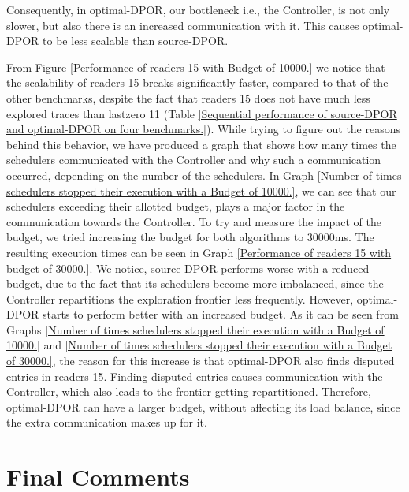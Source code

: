 Consequently, in optimal-DPOR, our bottleneck i.e., the Controller, is not only slower, but also there is an increased communication with it. This causes optimal-DPOR to be less scalable than source-DPOR.

From Figure \ref{Performance of readers 15 with Budget of 10000.} we notice that the scalability 
of readers 15 breaks significantly faster,
compared to that of the other benchmarks, despite the fact that readers 15 does not have much less explored traces than lastzero 11
(Table \ref{Sequential performance of source-DPOR and optimal-DPOR on four benchmarks.}). 
While trying to figure out the reasons behind this behavior, we have produced a graph that shows how many times the schedulers communicated with the Controller and why such a communication occurred, depending on the number of the schedulers. In Graph \ref{Number of times schedulers stopped their execution with a Budget of 10000.},
we can see that our schedulers exceeding their allotted budget, plays a major factor in the communication towards the Controller.
To try and measure the impact of the budget, we tried increasing the budget for both algorithms to 30000ms. The resulting execution times can be seen in Graph \ref{Performance of readers 15 with budget of 30000.}. We notice, source-DPOR performs worse with a reduced budget, due to the fact that its schedulers become more imbalanced, since the Controller repartitions the exploration frontier less frequently.
However, optimal-DPOR starts to perform better with an increased budget. As it can be seen from Graphs 
\ref{Number of times schedulers stopped their execution with a Budget of 10000.} and \ref{Number of times schedulers stopped their execution with a Budget of 30000.}, the reason for this increase is that optimal-DPOR also finds disputed entries in readers 15. Finding disputed entries causes communication with the Controller, which also leads to the frontier getting repartitioned. Therefore, optimal-DPOR can have a larger budget, without affecting its load balance, since the extra communication makes up for it.



\section{Final Comments}


